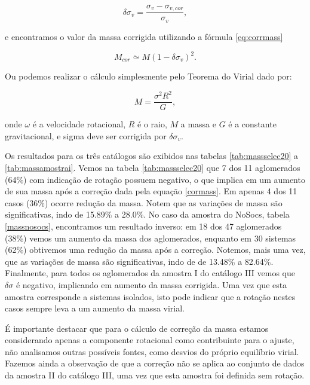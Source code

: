 \begin{equation}
\delta \sigma_{v} = \frac{\sigma_{v} - \sigma_{v,cor}}{\sigma_{v}},
\label{eq:corrveldisp}
\end{equation}

\noindent e encontramos o valor da massa corrigida utilizando a fórmula \ref{eq:corrmass}

\begin{equation}
M_{cor} \simeq M (1 - \delta \sigma_{v})^2.
\label{eq:corrmass}
\end{equation}


\noindent Ou podemos realizar o cálculo simplesmente pelo Teorema do Virial dado por: 

\begin{equation}
M = \frac{\sigma^2 R^2}{G},
\label{eq:massa}
\end{equation}

\noindent onde $\omega$ é a velocidade rotacional, $R$ é o raio, $M$ a massa e $G$ é a constante gravitacional, e sigma deve ser
corrigida por $\delta \sigma_{v}$.

Os resultados para os três catálogos são exibidos nas tabelas \ref{tab:massselec20} a \ref{tab:massamostrai}. 
Vemos na tabela \ref{tab:massselec20} que 7 dos 11 aglomerados (64\%) com indicação de rotação 
possuem  negativo, o que implica em um aumento de sua massa após a correção dada pela equação \ref{cormass}.
Em apenas 4 dos 11 casos (36\%) ocorre redução da massa. Notem que as variações de massa são significativas, indo de 15.89\% a 28.0\%.
No caso da amostra do NoSocs, tabela \ref{massnosocs}, encontramos um resultado inverso: em 18 dos 47 aglomerados (38\%) 
vemos um aumento da massa dos aglomerados, enquanto em 30 sistemas (62\%) obtivemos uma redução da massa após
a correção. Notemos, mais uma vez, que as variações de massa são significativas, indo de de 13.48\% a 82.64\%.
Finalmente, para todos os aglomerados da amostra I do catálogo III vemos que $\delta\sigma$ é negativo, implicando
em aumento da massa corrigida. Uma vez que esta amostra corresponde a sistemas isolados, isto pode indicar que a rotação nestes casos sempre leva a um aumento da massa virial.

É importante destacar que para o cálculo de correção da massa estamos considerando apenas a componente rotacional como contribuinte para o ajuste, não analisamos outras possíveis fontes, como desvios do próprio equilíbrio virial. Fazemos ainda a observação de que
a correção não se aplica ao conjunto de dados da amostra II do catálogo III, uma vez que esta amostra foi definida sem rotação.

